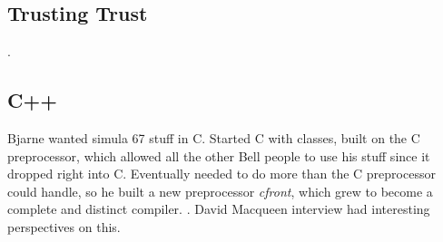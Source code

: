\subsection{Trusting Trust}

.

\subsection{C++}

Bjarne wanted simula 67 stuff in C. Started C with classes, built on the C preprocessor,
which allowed all the other Bell people to use his stuff since it dropped right into C.
Eventually needed to do more than the C preprocessor could handle, so he built a new
preprocessor \textit{cfront}, which grew to become a complete and distinct compiler.
.
David Macqueen interview had interesting perspectives on this.
